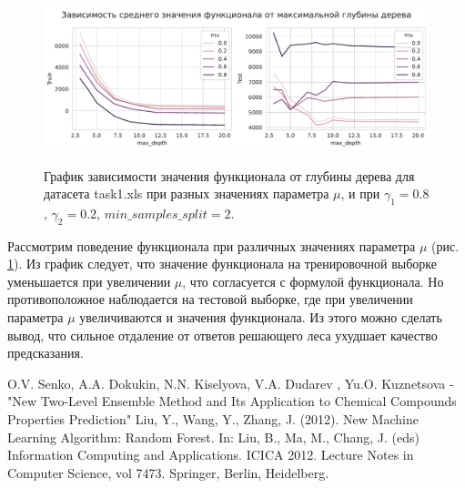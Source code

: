 \documentclass{article}
\begin{document}
\begin{figure}[h]
	\begin{center}
		\begin{minipage}[h]{1.0\linewidth}
			{\includegraphics[width=1.0\linewidth]{../figures/max_depth_task1_gamma_08_min_2.pdf}}	
		\end{minipage}
	\end{center}
	
	\caption{График зависимости значения функционала от глубины дерева для датасета task1.xls при разных значениях параметра $\mu$, и при $\gamma_1 = 0.8$, $\gamma_2 = 0.2$, $min\_samples\_split = 2$. }
	\label{ris:image7}
\end{figure}

Рассмотрим поведение функционала при различных значениях параметра $\mu$ (рис. \ref{ris:image7}). Из график следует, что значение функционала на тренировочной выборке уменьшается при увеличении $\mu$, что согласуется с формулой функционала. Но противоположное наблюдается на тестовой выборке, где при увеличении параметра $\mu$ увеличиваются и значения функционала. Из этого можно сделать вывод, что сильное отдаление от ответов решающего леса ухудшает качество предсказания.




\newpage



\begin{thebibliography}{}
	 O.V. Senko, A.A. Dokukin, N.N. Kiselyova, V.A. Dudarev
	, Yu.O. Kuznetsova - "New Two-Level Ensemble Method and Its Application to
	Chemical Compounds Properties Prediction"
	 Liu, Y., Wang, Y., Zhang, J. (2012). New Machine Learning Algorithm: Random Forest. In: Liu, B., Ma, M., Chang, J. (eds) Information Computing and Applications. ICICA 2012. Lecture Notes in Computer Science, vol 7473. Springer, Berlin, Heidelberg.
\end{thebibliography}
\end{document}

